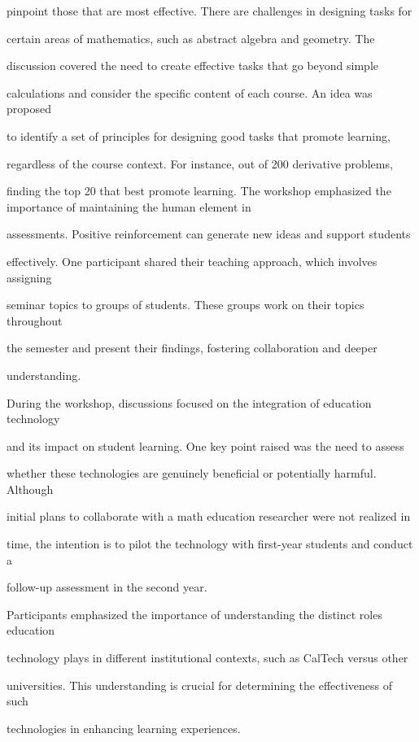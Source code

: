 \documentclass[11pt]{article}
\begin{document}
pinpoint those that are most effective. There are challenges in designing tasks for

certain areas of mathematics, such as abstract algebra and geometry. The

discussion covered the need to create effective tasks that go beyond simple

calculations and consider the specific content of each course. An idea was proposed

to identify a set of principles for designing good tasks that promote learning,

regardless of the course context. For instance, out of 200 derivative problems,

finding the top 20 that best promote learning. The workshop emphasized the importance of maintaining the human element in

assessments. Positive reinforcement can generate new ideas and support students

effectively. One participant shared their teaching approach, which involves assigning

seminar topics to groups of students. These groups work on their topics throughout

the semester and present their findings, fostering collaboration and deeper

understanding.

During the workshop, discussions focused on the integration of education technology

and its impact on student learning. One key point raised was the need to assess

whether these technologies are genuinely beneficial or potentially harmful. Although

initial plans to collaborate with a math education researcher were not realized in

time, the intention is to pilot the technology with first-year students and conduct a

follow-up assessment in the second year.

Participants emphasized the importance of understanding the distinct roles education

technology plays in different institutional contexts, such as CalTech versus other

universities. This understanding is crucial for determining the effectiveness of such

technologies in enhancing learning experiences.
\end{document}
